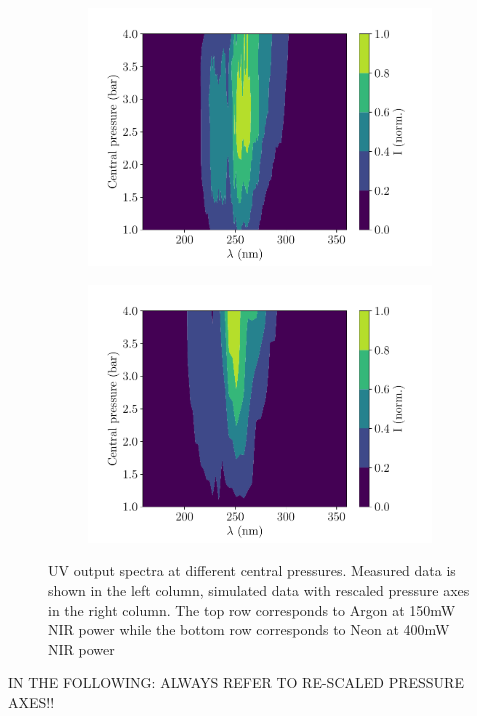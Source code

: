 \documentclass[a4paper]{jpconf}
\begin{document}
\begin{figure}[h]
\begin{subfigure}{0.49\textwidth}
        \includegraphics[width=\textwidth]{im/2d_spectra_pres_Ne_400mW_meas}
    \caption{}
    \end{subfigure}
    \begin{subfigure}{0.49\textwidth}
        \includegraphics[width=\textwidth]{im/2d_Ne_sim}
    \caption{}
    \end{subfigure}  
\caption{UV output spectra at different central pressures. Measured data is shown in the left column, simulated data with rescaled pressure axes in the right column. The top row corresponds to Argon at 150mW NIR power while the bottom row corresponds to Neon at 400mW NIR power}\label{im:spec_2d}
\end{figure}
IN THE FOLLOWING: ALWAYS REFER TO RE-SCALED PRESSURE AXES!!
\end{document}
